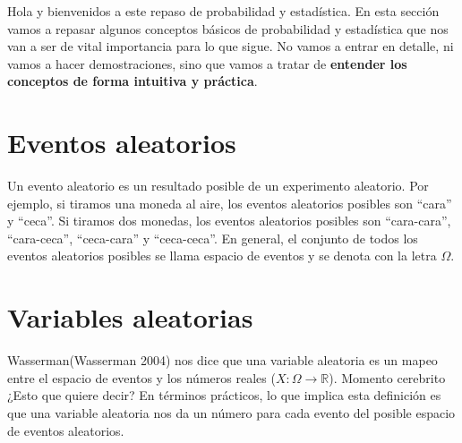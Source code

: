 \documentclass[
  letterpaper,
  DIV=11,
  numbers=noendperiod,
  oneside]{scrreprt}
\begin{document}
Hola y bienvenidos a este repaso de probabilidad y estadística. En esta
sección vamos a repasar algunos conceptos básicos de probabilidad y
estadística que nos van a ser de vital importancia para lo que sigue. No
vamos a entrar en detalle,
ni vamos a hacer demostraciones, sino que vamos a tratar de
\textbf{entender los conceptos de forma intuitiva y práctica}.

\hypertarget{eventos-aleatorios}{%
\section{Eventos aleatorios}\label{eventos-aleatorios}}

Un evento aleatorio es un resultado posible de un experimento aleatorio.
Por ejemplo, si tiramos una moneda al aire, los eventos aleatorios
posibles son ``cara'' y ``ceca''. Si tiramos dos monedas, los eventos
aleatorios posibles son ``cara-cara'', ``cara-ceca'', ``ceca-cara'' y
``ceca-ceca''. En general, el conjunto de todos los eventos aleatorios
posibles se llama espacio de eventos y se denota con la letra
\(\Omega\).

\hypertarget{variables-aleatorias}{%
\section{Variables aleatorias}\label{variables-aleatorias}}

Wasserman(Wasserman
2004)
nos dice que una variable aleatoria es un mapeo entre el espacio de
eventos y los números reales (\(X:\Omega \rightarrow \mathbb{R}\)).
Momento cerebrito ¿Esto que quiere decir? En términos prácticos, lo que
implica esta definición es que una variable aleatoria nos da un número
para cada evento del posible espacio de eventos aleatorios.
\end{document}
